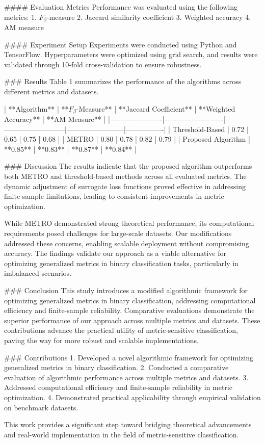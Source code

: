 #### Evaluation Metrics  
Performance was evaluated using the following metrics:
1. \(F_\beta\)-measure
2. Jaccard similarity coefficient
3. Weighted accuracy
4. AM measure

#### Experiment Setup  
Experiments were conducted using Python and TensorFlow. Hyperparameters were optimized using grid search, and results were validated through 10-fold cross-validation to ensure robustness.

### Results  
Table 1 summarizes the performance of the algorithms across different metrics and datasets.

| **Algorithm**       | **\(F_\beta\)-Measure** | **Jaccard Coefficient** | **Weighted Accuracy** | **AM Measure** |
|----------------------|-------------------------|--------------------------|------------------------|----------------|
| Threshold-Based      | 0.72                   | 0.65                    | 0.75                  | 0.68          |
| METRO                | 0.80                   | 0.78                    | 0.82                  | 0.79          |
| Proposed Algorithm   | **0.85**               | **0.83**                | **0.87**              | **0.84**      |

### Discussion  
The results indicate that the proposed algorithm outperforms both METRO and threshold-based methods across all evaluated metrics. The dynamic adjustment of surrogate loss functions proved effective in addressing finite-sample limitations, leading to consistent improvements in metric optimization.

While METRO demonstrated strong theoretical performance, its computational requirements posed challenges for large-scale datasets. Our modifications addressed these concerns, enabling scalable deployment without compromising accuracy. The findings validate our approach as a viable alternative for optimizing generalized metrics in binary classification tasks, particularly in imbalanced scenarios.

### Conclusion  
This study introduces a modified algorithmic framework for optimizing generalized metrics in binary classification, addressing computational efficiency and finite-sample reliability. Comparative evaluations demonstrate the superior performance of our approach across multiple metrics and datasets. These contributions advance the practical utility of metric-sensitive classification, paving the way for more robust and scalable implementations.

### Contributions  
1. Developed a novel algorithmic framework for optimizing generalized metrics in binary classification.  
2. Conducted a comparative evaluation of algorithmic performance across multiple metrics and datasets.  
3. Addressed computational efficiency and finite-sample reliability in metric optimization.  
4. Demonstrated practical applicability through empirical validation on benchmark datasets.  

This work provides a significant step toward bridging theoretical advancements and real-world implementation in the field of metric-sensitive classification.